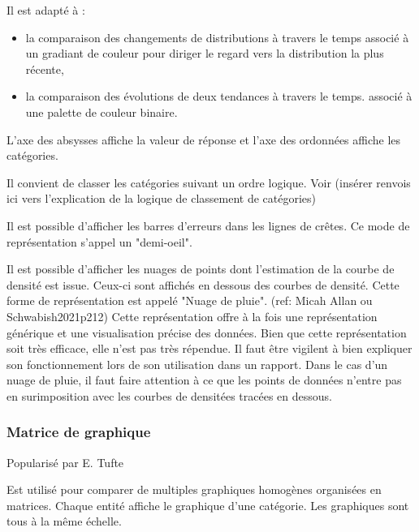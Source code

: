 \documentclass[a4paper,12pt]{article}
\begin{document}
\begin{multicols}{2}
Il est adapté à :
\begin{itemize}
\item la comparaison des changements de distributions à travers le temps \autocite{wilkeDirectoryVisualizations2019} associé à un gradiant de couleur pour diriger le regard vers la distribution la plus récente, \autocite{jonathanschwabishDistribution2021}
\item la comparaison des évolutions de deux tendances à travers le temps. \autocite{wilkeVisualizingManyDistributions2019} associé à une palette de couleur binaire.
\end{itemize}

L'axe des absysses affiche la valeur de réponse et l'axe des ordonnées affiche les catégories. \autocite{wilkeVisualizingManyDistributions2019}

Il convient de classer les catégories suivant un ordre logique. \autocite{jonathanschwabishDistribution2021} Voir (insérer renvois ici vers l'explication de la logique de classement de catégories)

Il est possible d'afficher les barres d'erreurs dans les lignes de crêtes. Ce mode de représentation s'appel un "demi-oeil". \autocite{wilkeVisualizingUncertainty2019}

Il est possible d'afficher les nuages de points dont l'estimation de la courbe de densité est issue. Ceux-ci sont affichés en dessous des courbes de densité. Cette forme de représentation est appelé "Nuage de pluie". (ref: Micah Allan ou Schwabish2021p212) Cette représentation offre à la fois une représentation générique et une visualisation précise des données. \autocite{jonathanschwabishDistribution2021} Bien que cette représentation soit très efficace, elle n'est pas très répendue. \autocite{jonathanschwabishDistribution2021} Il faut être vigilent à bien expliquer son fonctionnement lors de son utilisation dans un rapport. Dans le cas d'un nuage de pluie, il faut faire attention à ce que les points de données n'entre pas en surimposition avec les courbes de densitées tracées en dessous.
\subsubsection*{Matrice de graphique}
\label{sec:org44b2ac7}
Popularisé par E. Tufte

Est utilisé pour comparer de multiples graphiques homogènes organisées en matrices. Chaque entité affiche le graphique d'une catégorie. Les graphiques sont tous à la même échelle. \autocite{sosulskiGraphics2019}


\end{multicols}
\end{document}
